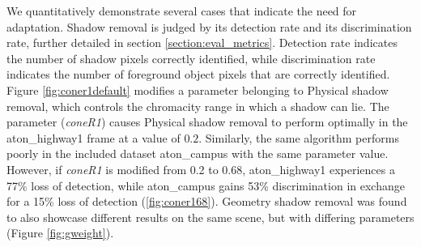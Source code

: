 We quantitatively demonstrate several cases that indicate the need for adaptation. Shadow removal is judged by its detection rate and its discrimination rate, further detailed in section \ref{section:eval_metrics}. Detection rate indicates the number of shadow pixels correctly identified, while discrimination rate indicates the number of foreground object pixels that are correctly identified. Figure \ref{fig:coner1default} modifies a parameter belonging to Physical shadow removal, which controls the chromacity range in which a shadow can lie. The parameter (\textit{coneR1}) causes Physical shadow removal to perform optimally in the aton\_highway1 frame at a value of $0.2$. Similarly, the same algorithm performs poorly in the included dataset aton\_campus with the same parameter value. However, if \textit{coneR1} is modified from 0.2 to 0.68, aton\_highway1 experiences a 77\% loss of detection, while aton\_campus gains 53\% discrimination in exchange for a 15\% loss of detection (\ref{fig:coner168}). Geometry shadow removal was found to also showcase different results on the same scene, but with differing parameters (Figure \ref{fig:gweight}). 


